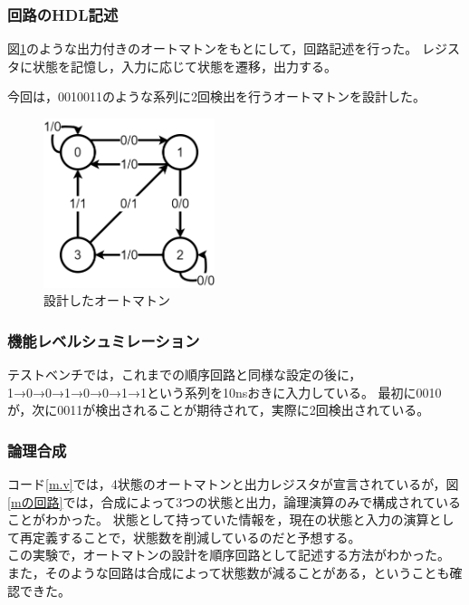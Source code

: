 \subsubsection{回路のHDL記述}
図\ref{設計したオートマトン}のような出力付きのオートマトンをもとにして，回路記述を行った。
レジスタに状態を記憶し，入力に応じて状態を遷移，出力する。

今回は，0010011のような系列に2回検出を行うオートマトンを設計した。

\begin{figure}[H]
  \centering
  \includegraphics[width=5cm]{./src/m/mautomaton.png}
  \caption{設計したオートマトン}
  \label{設計したオートマトン}
\end{figure}
\subsubsection{機能レベルシュミレーション}
テストベンチでは，これまでの順序回路と同様な設定の後に，1→0→0→1→0→0→1→1という系列を10nsおきに入力している。
最初に0010が，次に0011が検出されることが期待されて，実際に2回検出されている。

\subsubsection{論理合成}
コード\ref{m.v}では，4状態のオートマトンと出力レジスタが宣言されているが，図\ref{mの回路}では，合成によって3つの状態と出力，論理演算のみで構成されていることがわかった。
状態として持っていた情報を，現在の状態と入力の演算として再定義することで，状態数を削減しているのだと予想する。\\

この実験で，オートマトンの設計を順序回路として記述する方法がわかった。
また，そのような回路は合成によって状態数が減ることがある，ということも確認できた。
